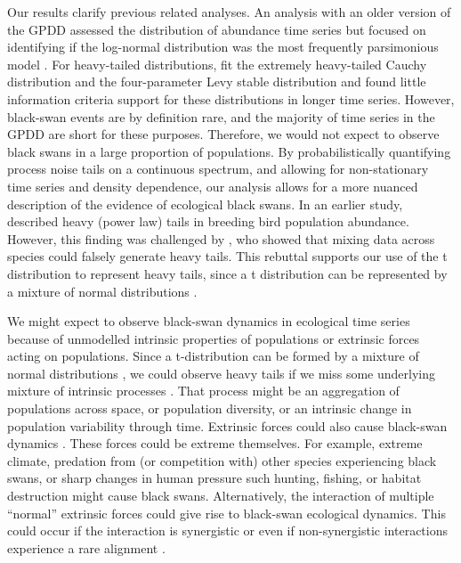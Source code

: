 Our results clarify previous related analyses. An analysis with an older version of the GPDD assessed the distribution of abundance time series but focused on identifying if the log-normal distribution was the most frequently parsimonious model \citep{halley2002}. For heavy-tailed distributions, \citet{halley2002} fit the extremely heavy-tailed Cauchy distribution and the four-parameter Levy stable distribution and found little information criteria support for these distributions in longer time series. However, black-swan events are by definition rare, and the majority of time series in the GPDD are short for these purposes. Therefore, we would not expect to observe black swans in a large proportion of populations. By probabilistically quantifying process noise tails on a continuous spectrum, and allowing for non-stationary time series and density dependence, our analysis allows for a more nuanced description of the evidence of ecological black swans. In an earlier study, \citet{keitt1998} described heavy (power law) tails in breeding bird population abundance. However, this finding was challenged by \citet{allen2001}, who showed that mixing data across species could falsely generate heavy tails. This rebuttal supports our use of the t distribution to represent heavy tails, since a t distribution can be represented by a mixture of normal distributions \citep[with the same mean and inverse-gamma-distributed variances,][]{gelman2014}.

We might expect to observe black-swan dynamics in ecological time series because of unmodelled intrinsic properties of populations or extrinsic forces acting on populations. Since a t-distribution can be formed by a mixture of normal distributions \citep{gelman2014}, we could observe heavy tails if we miss some underlying mixture of intrinsic processes \citep{allen2001}. That process might be an aggregation of populations across space, or population diversity, or an intrinsic change in population variability through time. Extrinsic forces could also cause black-swan dynamics \citep[e.g.][]{nunez2012}. These forces could be extreme themselves. For example, extreme climate, predation from (or competition with) other species experiencing black swans, or sharp changes in human pressure such hunting, fishing, or habitat destruction might cause black swans. Alternatively, the interaction of multiple ``normal'' extrinsic forces could give rise to black-swan ecological dynamics. This could occur if the interaction is synergistic \citep[e.g.][]{kirby2009} or even if non-synergistic interactions experience a rare alignment \citep{denny2009}.

